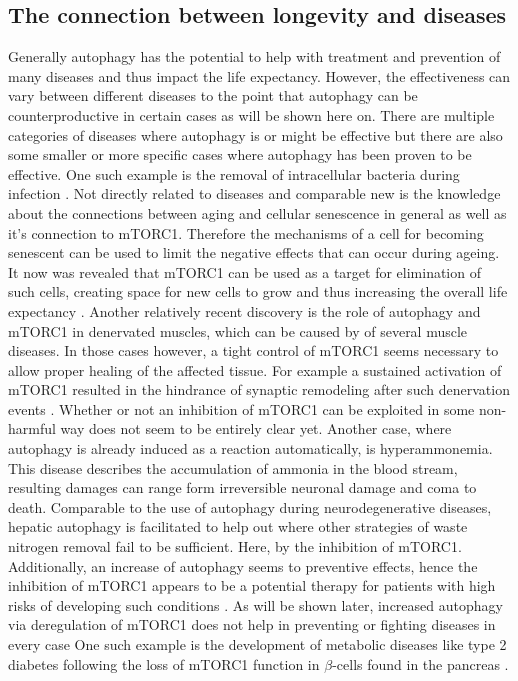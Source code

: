 \documentclass[12pt]{article} %
\begin{document}
\begin{linenumbers*}
\subsection{The connection between longevity and diseases}
Generally autophagy has the potential to help with treatment and prevention of many diseases and thus impact the life expectancy. However, the effectiveness can vary between different diseases to the point that autophagy can be counterproductive in certain cases as will be shown here on.
There are multiple categories of diseases where autophagy is or might be effective but there are also some smaller or more specific cases where autophagy has been proven to be effective. One such example is the removal of intracellular bacteria during infection \citep{Dikic2018}.
Not directly related to diseases and comparable new is the knowledge about the connections between aging and cellular senescence in general as well as it's connection to mTORC1. Therefore the mechanisms of a cell for becoming senescent can be used to limit the negative effects that can occur during ageing. It now was revealed that mTORC1 can be used as a target for elimination of such cells, creating space for new cells to grow and thus increasing the overall life expectancy \citep{Kucheryavenko2019}.
Another relatively recent discovery is the role of autophagy and mTORC1 in denervated muscles, which can be caused by of several muscle diseases. In those cases however, a tight control of mTORC1 seems necessary to allow proper healing of the affected tissue. For example a sustained activation of mTORC1 resulted in the hindrance of synaptic remodeling after such denervation events \citep{Castets2019}. Whether or not an inhibition of mTORC1 can be exploited in some non-harmful way does not seem to be entirely clear yet. 
Another case, where autophagy is already induced as a reaction automatically, is hyperammonemia. This disease describes the accumulation of ammonia in the blood stream, resulting damages can range form irreversible neuronal damage and coma to death. Comparable to the use of autophagy during neurodegenerative diseases, hepatic autophagy is facilitated to help out where other strategies of waste nitrogen removal fail to be sufficient. Here, by the inhibition of mTORC1. Additionally, an increase of autophagy seems to preventive effects, hence the inhibition of mTORC1 appears to be a potential therapy for patients with high risks of developing such conditions \citep{Soria2018}.
As will be shown later, increased autophagy via deregulation of mTORC1 does not help in preventing or fighting diseases in every case One such example is the development of metabolic diseases like type 2 diabetes following the loss of mTORC1 function in $\beta$-cells found in the pancreas \citep{BlandinoRosano2017}.


\end{linenumbers*}
\end{document}
